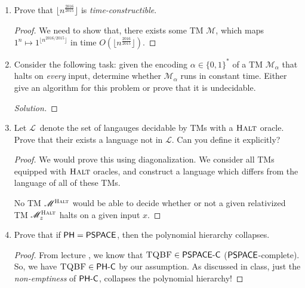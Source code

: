 \documentclass[usletter]{article}
\newcommand {\langset}[1]      {\ensuremath{\mathcal{#1}}}
\newcommand {\machine}[1]      {\ensuremath{\mathscr{#1}}}
\newcommand {\family}[1]       {\ensuremath{\textnormal{\textsf{#1}}}}
\newcommand {\namedlangset}[1] {\ensuremath{\textnormal{\textsc{#1}}}}
\newcommand {\term}[1]      {\textit{#1}}
\newcommand {\langL}          {\langset{L}}
\newcommand {\machineM}       {\machine{M}}
\newcommand {\allstrings}     {\ensuremath{\{0,1\}^*}}
\begin{document}
\begin{enumerate}
\begin{proof}
    Thus, we have proved that
    $\langL(\machineM') =
     \langL_1 \cup (\langL_2 \cap \langL_3) \in \family{NP}$.
  \end{proof}

\begin{remark}
    In fact, we can always treat unions as disjunctions and intersections as
    conjunctions over machine outputs;
    to prove that \family{NP} is closed under these operations.
  \end{remark}

  \item Prove that $\lfloor n^{\frac{2016}{2015}} \rfloor$
        is \term{time-constructible}.
  \begin{proof}
    We need to show that, there exists some TM \machineM,
    which maps $1^n \mapsto 1^{\lfloor n^{2016/2015} \rfloor}$
    in time $O(\lfloor n^{\frac{2016}{2015}} \rfloor)$.
  \end{proof}

  \item Consider the following task: given the encoding $\alpha \in \allstrings$
        of a TM $\machineM_\alpha$ that halts on \textit{every} input,
        determine whether $\machineM_\alpha$ runs in constant time.
        Either give an algorithm for this problem
        or prove that it is undecidable.
  \begin{proof}[Solution]
  \end{proof}

  \item Let \langL\ denote the set of langauges decidable by TMs with a
        \namedlangset{Halt} oracle.
        Prove that their exists a language not in \langL.
        Can you define it explicitly?
  \begin{proof}
    We would prove this using diagonalization. We consider all TMs equipped with
    \namedlangset{Halt} oracles, and construct a language which differs from the
    language of all of these TMs.

    No TM $\machineM^\namedlangset{Halt}$ would be able to decide whether or not
    a given relativized TM $\machineM_z^\namedlangset{Halt}$ halts on a given
    input $x$.
  \end{proof}

  \item Prove that if $\family{PH} = \family{PSPACE}$,
        then the polynomial hierarchy collapses.
  \begin{proof}
    From lecture \cite{lec6}, we know that
    $\namedlangset{TQBF} \in \family{PSPACE-C}$ (\family{PSPACE}-complete).
    So, we have $\namedlangset{TQBF} \in \family{PH-C}$ by our assumption.
    As discussed in class, just the \textit{non-emptiness} of \family{PH-C},
    collapses the polynomial hierarchy!
  \end{proof}


\end{enumerate}
\end{document}
